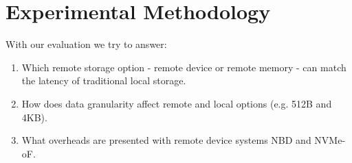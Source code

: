 \section{Experimental Methodology}
With our evaluation we try to answer: 

\begin{enumerate}[itemsep=2pt]
    \item Which remote storage option - remote device or remote memory - can match the latency of traditional local storage.
    \item How does data granularity affect remote and local options (e.g. 512B and 4KB).
    \item What overheads are presented with remote device systems NBD and NVMe-oF.
\end{enumerate}

\vspace{1em}

